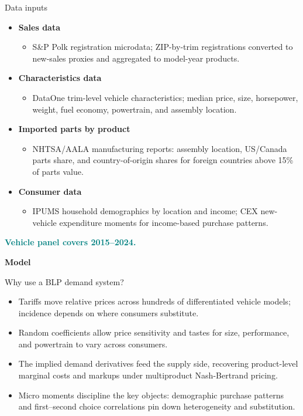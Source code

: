 \documentclass[aspectratio=169,11pt]{beamer}
\begin{document}
\begin{frame}{Data inputs}
  \begin{itemize}
    \item \textbf{Sales data}
      \begin{itemize}
        \item S\&P Polk registration microdata; ZIP-by-trim registrations converted to new-sales proxies and aggregated to model-year products.
      \end{itemize}
    \item \textbf{Characteristics data}
      \begin{itemize}
        \item DataOne trim-level vehicle characteristics; median price, size, horsepower, weight, fuel economy, powertrain, and assembly location.
      \end{itemize}
    \item \textbf{Imported parts by product}
      \begin{itemize}
        \item NHTSA/AALA manufacturing reports: assembly location, US/Canada parts share, and country-of-origin shares for foreign countries above 15\% of parts value.
      \end{itemize}
    \item \textbf{Consumer data}
      \begin{itemize}
        \item IPUMS household demographics by location and income; CEX new-vehicle expenditure moments for income-based purchase patterns.
      \end{itemize}
  \end{itemize}
  \vfill
  \begin{center}
    \textcolor{teal}{\bfseries Vehicle panel covers 2015--2024.}
  \end{center}
\end{frame}

\begin{frame}[plain]
  \vspace{1.0cm}
  {\Huge\bfseries Model}
\end{frame}

\begin{frame}{Why use a BLP demand system?}
  \begin{itemize}
    \item Tariffs move relative prices across hundreds of differentiated vehicle models; incidence depends on where consumers substitute.
    \item Random coefficients allow price sensitivity and tastes for size, performance, and powertrain to vary across consumers.
    \item The implied demand derivatives feed the supply side, recovering product-level marginal costs and markups under multiproduct Nash-Bertrand pricing.
    \item Micro moments discipline the key objects: demographic purchase patterns and first--second choice correlations pin down heterogeneity and substitution.
  \end{itemize}
\end{frame}
\end{document}
